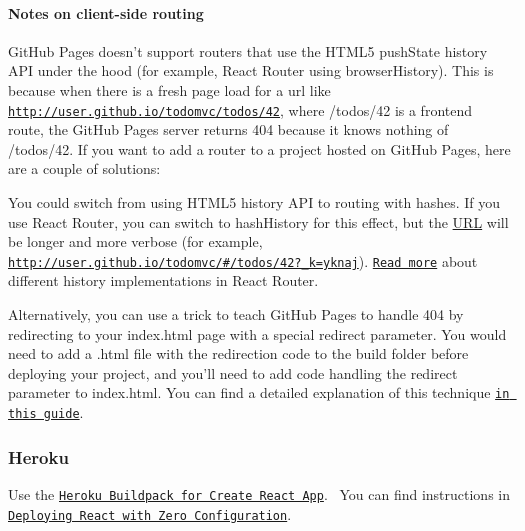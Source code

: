 \paragraph*{Notes on client-\/side routing}

Git\+Hub Pages doesn’t support routers that use the H\+T\+M\+L5 {\ttfamily push\+State} history A\+PI under the hood (for example, React Router using {\ttfamily browser\+History}). This is because when there is a fresh page load for a url like {\ttfamily \href{http://user.github.io/todomvc/todos/42}{\tt http\+://user.\+github.\+io/todomvc/todos/42}}, where {\ttfamily /todos/42} is a frontend route, the Git\+Hub Pages server returns 404 because it knows nothing of {\ttfamily /todos/42}. If you want to add a router to a project hosted on Git\+Hub Pages, here are a couple of solutions\+:


\begin{DoxyItemize}
\item You could switch from using H\+T\+M\+L5 history A\+PI to routing with hashes. If you use React Router, you can switch to {\ttfamily hash\+History} for this effect, but the \mbox{\hyperlink{namespace_u_r_l}{U\+RL}} will be longer and more verbose (for example, {\ttfamily \href{http://user.github.io/todomvc/#/todos/42?_k=yknaj}{\tt http\+://user.\+github.\+io/todomvc/\#/todos/42?\+\_\+k=yknaj}}). \href{https://reacttraining.com/react-router/web/api/Router}{\tt Read more} about different history implementations in React Router.
\item Alternatively, you can use a trick to teach Git\+Hub Pages to handle 404 by redirecting to your {\ttfamily index.\+html} page with a special redirect parameter. You would need to add a {.\+html} file with the redirection code to the {\ttfamily build} folder before deploying your project, and you’ll need to add code handling the redirect parameter to {\ttfamily index.\+html}. You can find a detailed explanation of this technique \href{https://github.com/rafrex/spa-github-pages}{\tt in this guide}.
\end{DoxyItemize}

\subsubsection*{Heroku}

Use the \href{https://github.com/mars/create-react-app-buildpack}{\tt Heroku Buildpack for Create React App}.~\newline
 You can find instructions in \href{https://blog.heroku.com/deploying-react-with-zero-configuration}{\tt Deploying React with Zero Configuration}.

